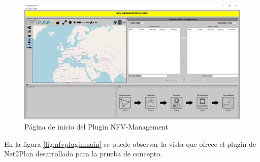 \begin{figure}[!ht]
	\centering
	\includegraphics[width=0.8\linewidth]{imagenes/nfvplugin_dashboard}
	\caption{Página de inicio del Plugin NFV-Management}
	\label{fig:nfvplugindash}
\end{figure}


En la figura \ref{fig:nfvpluginmain} se puede observar la vista que ofrece el plugin de Net2Plan desarrollado para la prueba de concepto.



\cleardoublepage